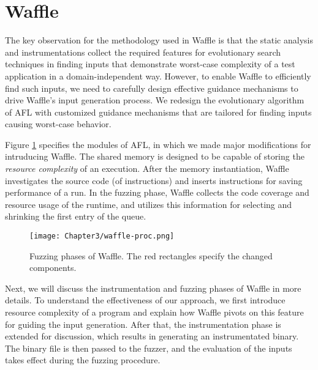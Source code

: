 \section{Waffle}
\label{sec:3-instr}


The key observation for the methodology used in Waffle is that the static analysis and instrumentations collect the required features for evolutionary search techniques in finding inputs that demonstrate worst-case complexity of a test application in a domain-independent way. However, to enable Waffle to efficiently find such inputs, we need to carefully design effective guidance mechanisms to drive Waffle's input generation process. We redesign the evolutionary algorithm of AFL with customized guidance mechanisms that are tailored for finding inputs causing worst-case behavior.

Figure \ref{fig:waffle-phases} specifies the modules of AFL, in which we made major modifications for intruducing Waffle. The shared memory is designed to be capable of storing the \textit{resource complexity} of an execution. After the memory instantiation, Waffle investigates the source code (of instructions) and inserts instructions for saving performance of a run. In the fuzzing phase, Waffle collects the code coverage and resource usage of the runtime, and utilizes this information for selecting and shrinking the first entry of the queue.

\begin{figure}[!b]
  \texttt{[image: Chapter3/waffle-proc.png]}
  \centering
  \caption{Fuzzing phases of Waffle. The red rectangles specify the changed components.}
  \label{fig:waffle-phases}
\end{figure}



Next, we will discuss the instrumentation and fuzzing phases of Waffle in more details. To understand the effectiveness of our approach, we first introduce resource complexity of a program and explain how Waffle pivots on this feature for guiding the input generation. After that, the instrumentation phase is extended for discussion, which results in generating an instrumentated binary. The binary file is then passed to the fuzzer, and the evaluation of the inputs takes effect during the fuzzing procedure.

